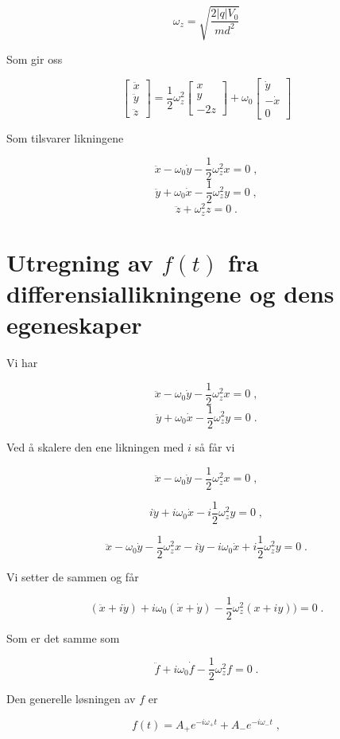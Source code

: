 \documentclass[reprint,english,notitlepage, nofootinbib]{revtex4-1}  %
\begin{document}
$$ \omega_z = \sqrt{\frac{2|q|V_0}{md^2}}$$

Som gir oss

$$\begin{bmatrix} \ddot{x} \\ \ddot{y} \\ \ddot{z} \end{bmatrix} = \frac{1}{2}\omega_z^2 \begin{bmatrix}
x \\ y \\ -2z 
\end{bmatrix} + \omega_0 \begin{bmatrix}
\dot{y} \\ -\dot{x} \\ 0
\end{bmatrix}$$ 

Som tilsvarer likningene

$$
\ddot{x} - \omega_0 \dot{y} - \frac{1}{2}\omega_z^2 x = 0 \; ,
$$
$$\ddot{y} + \omega_0 \dot{x} - \frac{1}{2}\omega_z^2 y = 0 \; ,
$$
$$\ddot{z} + \omega_z^2 z = 0 \; .
$$
\section{Utregning av $f(t)$ fra differensiallikningene og dens egeneskaper}\label{utfxy}

Vi har 

$$
\ddot{x} - \omega_0 \dot{y} - \frac{1}{2}\omega_z^2 x = 0 \; ,
$$
$$\ddot{y} + \omega_0 \dot{x} - \frac{1}{2}\omega_z^2 y = 0 \; .
$$

Ved å skalere den ene likningen med $i$ så får vi

$$\ddot{x} - \omega_0 \dot{y} - \frac{1}{2}\omega_z^2 x = 0 \; ,$$

$$i\ddot{y} + i\omega_0 \dot{x} - i\frac{1}{2}\omega_z^2 y = 0 \; ,$$

$$ \ddot{x} - \omega_0 \dot{y} - \frac{1}{2}\omega_z^2 x -i\ddot{y} - i\omega_0 \dot{x} + i\frac{1}{2}\omega_z^2 y = 0 \; .$$

Vi setter de sammen og får


$$(\ddot{x} + i\ddot{y}) + i\omega_0(\dot{x} + \dot{y}) - \frac{1}{2}\omega_z^2(x+iy) ) = 0 \; .$$
  
Som er det samme som

$$\ddot{f} + i\omega_0 \dot{f} - \frac{1}{2}\omega_z^2f = 0 \; .$$

Den generelle løsningen av $f$ er

$$f(t) =A_+e^{-i\omega_+ t} + A_-e^{-i\omega_- t} \; ,$$
\end{document}
